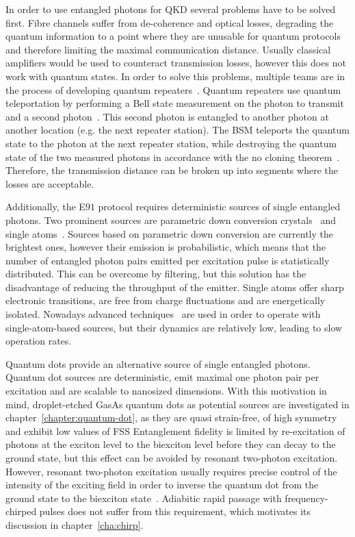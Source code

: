 In order to use entangled photons for \ac{QKD} several problems have to be solved first.
Fibre channels suffer from de-coherence and optical losses, degrading the quantum information to a point where they are unusable for quantum protocols and therefore limiting the maximal communication distance.
Usually classical amplifiers would be used to counteract transmission losses, however this does not work with quantum states.
In order to solve this problems, multiple teams are in the process of developing quantum repeaters~\cite{reindl_all-photonic_2018}\cite{duan_long-distance_2001}\cite{simon_quantum_2007}.
Quantum repeaters use quantum teleportation by performing a Bell state measurement on the photon to transmit and a second photon~\cite{bennett_teleporting_1993}.
This second photon is entangled to another photon at another location (e.g. the next repeater station).
The \ac{BSM} teleports the quantum state to the photon at the next repeater station, while destroying the quantum state of the two measured photons in accordance with the no cloning theorem~\cite{park_concept_1970}.
Therefore, the transmission distance can be broken up into segments where the losses are acceptable.

Additionally, the E$91$ protocol requires deterministic sources of single entangled photons.
Two prominent sources are parametric down conversion crystals~\cite{shih_new_1988} and single atoms~\cite{aspect_experimental_1981}.
Sources based on parametric down conversion are currently the brightest ones, however their emission is probabilistic, which means that the number of entangled photon pairs emitted per excitation pulse is statistically distributed.
This can be overcome by filtering, but this solution has the disadvantage of reducing the throughput of the emitter.
Single atoms offer sharp electronic transitions, are free from charge fluctuations and are energetically isolated.
Nowadays advanced techniques~\cite{kuhn_deterministic_2002} are used in order to operate with single-atom-based sources, but their dynamics are relatively low, leading to slow operation rates.

Quantum dots provide an alternative source of single entangled photons.
Quantum dot sources are deterministic, emit maximal one photon pair per excitation and are scalable to nanosized dimensions.
With this motivation in mind, droplet-etched GasAs quantum dots as potential sources are investigated in chapter~\ref{chapter:quantum-dot}, as they are quasi strain-free, of high symmetry and exhibit low values of \ac{FSS}
Entanglement fidelity is limited by re-excitation of photons at the exciton level to the biexciton level before they can decay to the ground state, but this effect can be avoided by resonant two-photon excitation.
However, resonant two-photon excitation usually requires precise control of the intensity of the exciting field in order to inverse the quantum dot from the ground state to the biexciton state~\cite{jayakumar_deterministic_2013}.
Adiabitic rapid passage with frequency-chirped pulses does not suffer from this requirement, which motivates its discussion in chapter~\ref{cha:chirp}.

